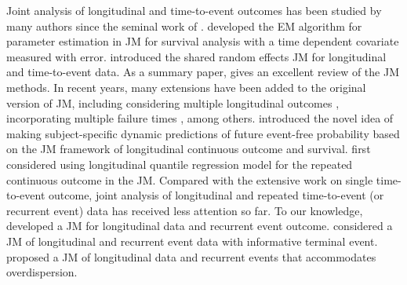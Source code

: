 Joint analysis of longitudinal and time-to-event outcomes has been studied by many authors since the seminal work of \cite{self1992modeling, tsiatis1995modeling}. \cite{wulfsohn1997joint} developed the EM algorithm for parameter estimation in JM for survival analysis with a time dependent covariate measured with error. \cite{henderson2000joint} introduced the shared random effects JM for longitudinal and time-to-event data. As a summary paper, \cite{tsiatis2004joint} gives an excellent review of the JM methods. In recent years, many extensions have been added to the original version of JM, including considering multiple longitudinal outcomes \citep{brown2005flexible,rizopoulos2011bayesian}, incorporating multiple failure times \citep{elashoff2008joint}, among others. \cite{rizopoulos2011dynamic,taylor2013real} introduced the novel idea of making subject-specific dynamic predictions of future event-free probability based on the JM framework of longitudinal continuous outcome and survival. \cite{farcomeni2015longitudinal} first considered using longitudinal quantile regression model for the repeated continuous outcome in the JM. Compared with the extensive work on single time-to-event outcome, joint analysis of longitudinal and repeated time-to-event (or recurrent event) data has received less attention so far. To our knowledge, \cite{henderson2000joint} developed a JM for longitudinal data and recurrent event outcome. \cite{kim2012joint} considered a JM of longitudinal and recurrent event data with informative terminal event. \cite{efendi2013joint} proposed a JM of longitudinal data and recurrent events that accommodates overdispersion.


